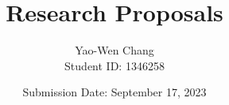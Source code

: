 \documentclass[twocolumn]{article}
\begin{document}
\title{Research Proposals}
\author{Yao-Wen Chang\\Student ID: 1346258}
\date{Submission Date: September 17, 2023}












\end{document}
